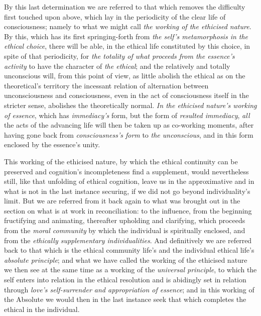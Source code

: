 \documentclass[12pt,a4paper]{book}
\begin{document}
By this last determination we are referred to that which removes the difficulty
first touched upon above, which lay in the periodicity of the clear life of
consciousness; namely to what we might call \emph{the working of the ethicised
nature}. By this, which has its first springing-forth from \emph{the self's
metamorphosis in the ethical choice}, there will be able, in the ethical life
constituted by this choice, in spite of that periodicity, for \emph{the totality
of what proceeds from the essence's activity} to have the character of \emph{the
ethical}; and the relatively and totally unconscious will, from this point of
view, as little abolish the ethical as on the theoretical's territory the
incessant relation of alternation between unconsciousness and consciousness,
even in the act of consciousness itself in the stricter sense, abolishes the
theoretically normal. \emph{In the ethicised nature's working of essence}, which
has \emph{immediacy's} form, but the form of \emph{resulted immediacy},
\emph{all} the acts of the advancing life will then be taken up as co-working
moments, after having gone back from \emph{consciousness's form} to \emph{the
unconscious}, and in this form enclosed by the essence's unity.

This working of the ethicised nature, by which the ethical continuity can be
preserved and cognition's incompleteness find a supplement, would nevertheless
still, like that unfolding of ethical cognition, leave us in the approximative
and in what is not in the last instance securing, if we did not go beyond
individuality's limit. But we are referred from it back again to what was
brought out in the section on what is at work in reconciliation: to the
influence, from the beginning fructifying and animating, thereafter upholding
and clarifying, which proceeds from the \emph{moral community} by which the
individual is spiritually enclosed, and from the \emph{ethically supplementary
individualities}. And definitively we are referred back to that which is the
ethical community life's and the individual ethical life's \emph{absolute
principle}; and what we have called the working of the ethicised nature we then
see at the same time as a working of the \emph{universal principle},
to which the self enters into relation in the ethical resolution and is
abidingly set in relation through \emph{love's self-surrender and appropriation
of essence}; and in this working of the Absolute we would then in the last
instance seek that which completes the ethical in the individual.
\end{document}
